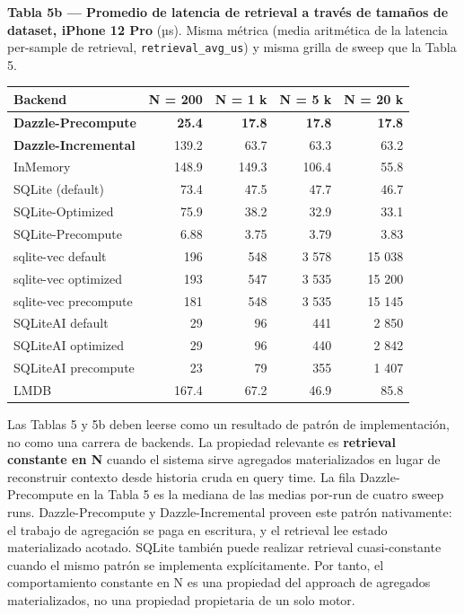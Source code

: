 \textbf{Tabla 5b --- Promedio de latencia de retrieval a través de tamaños de
dataset, iPhone 12 Pro} (µs). Misma métrica (media aritmética de la latencia
per-sample de retrieval, \texttt{retrieval\_avg\_us}) y misma grilla de sweep
que la Tabla 5.

{\def\LTcaptype{none} %
\begin{longtable}[]{@{}lrrrr@{}}
\toprule\noalign{}
Backend & N = 200 & N = 1 k & N = 5 k & N = 20 k \\
\midrule\noalign{}
\endhead
\bottomrule\noalign{}
\endlastfoot
\textbf{Dazzle-Precompute} & \textbf{25.4} & \textbf{17.8} & \textbf{17.8} &
\textbf{17.8} \\
\textbf{Dazzle-Incremental} & 139.2 & 63.7 & 63.3 & 63.2 \\
InMemory & 148.9 & 149.3 & 106.4 & 55.8 \\
SQLite (default) & 73.4 & 47.5 & 47.7 & 46.7 \\
SQLite-Optimized & 75.9 & 38.2 & 32.9 & 33.1 \\
SQLite-Precompute & 6.88 & 3.75 & 3.79 & 3.83 \\
sqlite-vec default & 196 & 548 & 3 578 & 15 038 \\
sqlite-vec optimized & 193 & 547 & 3 535 & 15 200 \\
sqlite-vec precompute & 181 & 548 & 3 535 & 15 145 \\
SQLiteAI default & 29 & 96 & 441 & 2 850 \\
SQLiteAI optimized & 29 & 96 & 440 & 2 842 \\
SQLiteAI precompute & 23 & 79 & 355 & 1 407 \\
LMDB & 167.4 & 67.2 & 46.9 & 85.8 \\
\end{longtable}
}

Las Tablas 5 y 5b deben leerse como un resultado de patrón de implementación, no
como una carrera de backends. La propiedad relevante es \textbf{retrieval
constante en N} cuando el sistema sirve agregados materializados en lugar de
reconstruir contexto desde historia cruda en query time. La fila
Dazzle-Precompute en la Tabla 5 es la mediana de las medias por-run de cuatro
sweep runs. Dazzle-Precompute y Dazzle-Incremental proveen este patrón
nativamente: el trabajo de agregación se paga en escritura, y el retrieval lee
estado materializado acotado. SQLite también puede realizar retrieval
cuasi-constante cuando el mismo patrón se implementa explícitamente. Por tanto,
el comportamiento constante en N es una propiedad del approach de agregados
materializados, no una propiedad propietaria de un solo motor.

